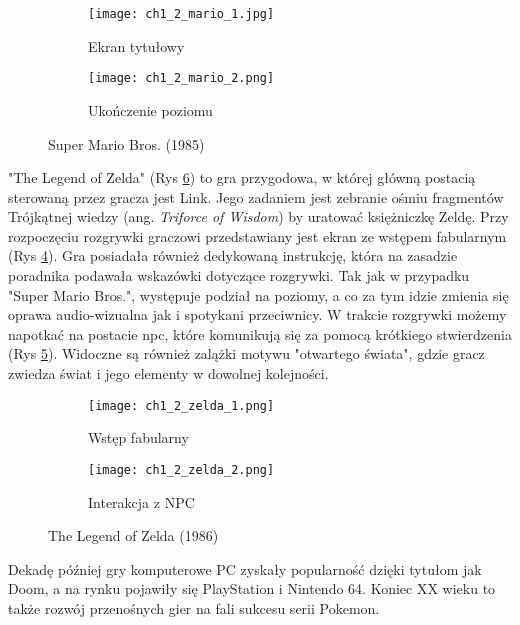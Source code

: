 \begin{figure}[h]
	\begin{subfigure}{0.49\textwidth}
		\caption{Ekran tytułowy}
		\texttt{[image: ch1\_2\_mario\_1.jpg]}
		\label{subfig:ch_1_2_mario_1}
	\end{subfigure}
	\begin{subfigure}{0.49\textwidth}
		\caption{Ukończenie poziomu}
		\texttt{[image: ch1\_2\_mario\_2.png]}
		\label{subfig:ch_1_2_mario_2}
	\end{subfigure}
	\caption{Super Mario Bros. (1985)}
	\label{fig:ch1_2_super_mario_bros}
\end{figure}

"The Legend of Zelda" (Rys \ref{fig:ch1_2_zelda}) to gra przygodowa, w której główną postacią sterowaną
przez gracza jest Link. Jego zadaniem jest zebranie ośmiu fragmentów Trójkątnej wiedzy
(ang. \textit{Triforce of Wisdom}) by uratować księżniczkę Zeldę. Przy rozpoczęciu rozgrywki graczowi
przedstawiany jest ekran ze wstępem fabularnym (Rys \ref{subfig:ch_1_2_zelda_1}). Gra posiadała
również dedykowaną instrukcję, która na zasadzie poradnika podawała wskazówki dotyczące rozgrywki.
Tak jak w przypadku "Super Mario Bros.", występuje podział na poziomy, a co za tym idzie zmienia się
oprawa audio-wizualna jak i spotykani przeciwnicy. W trakcie rozgrywki możemy napotkać na postacie
\gls{npc}, które komunikują się za pomocą krótkiego stwierdzenia
(Rys \ref{subfig:ch_1_2_zelda_2}). Widoczne są również zalążki motywu "otwartego świata", gdzie gracz
zwiedza świat i jego elementy w dowolnej kolejności.

\begin{figure}[h]
	\begin{subfigure}{0.49\textwidth}
		\caption{Wstęp fabularny}
		\texttt{[image: ch1\_2\_zelda\_1.png]}
		\label{subfig:ch_1_2_zelda_1}
	\end{subfigure}
	\begin{subfigure}{0.49\textwidth}
		\caption{Interakcja z NPC}
		\texttt{[image: ch1\_2\_zelda\_2.png]}
		\label{subfig:ch_1_2_zelda_2}
	\end{subfigure}
	\caption{The Legend of Zelda (1986)}
	\label{fig:ch1_2_zelda}
\end{figure}

Dekadę później gry komputerowe PC zyskały popularność dzięki tytułom jak Doom, a na rynku
pojawiły się PlayStation i Nintendo 64. Koniec XX wieku to także rozwój przenośnych gier na
fali sukcesu serii Pokemon.

